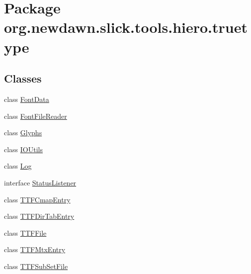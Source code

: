 \hypertarget{namespaceorg_1_1newdawn_1_1slick_1_1tools_1_1hiero_1_1truetype}{}\section{Package org.\+newdawn.\+slick.\+tools.\+hiero.\+truetype}
\label{namespaceorg_1_1newdawn_1_1slick_1_1tools_1_1hiero_1_1truetype}
\subsection*{Classes}
\begin{DoxyCompactItemize}
\item 
class \mbox{\hyperlink{classorg_1_1newdawn_1_1slick_1_1tools_1_1hiero_1_1truetype_1_1_font_data}{Font\+Data}}
\item 
class \mbox{\hyperlink{classorg_1_1newdawn_1_1slick_1_1tools_1_1hiero_1_1truetype_1_1_font_file_reader}{Font\+File\+Reader}}
\item 
class \mbox{\hyperlink{classorg_1_1newdawn_1_1slick_1_1tools_1_1hiero_1_1truetype_1_1_glyphs}{Glyphs}}
\item 
class \mbox{\hyperlink{classorg_1_1newdawn_1_1slick_1_1tools_1_1hiero_1_1truetype_1_1_i_o_utils}{I\+O\+Utils}}
\item 
class \mbox{\hyperlink{classorg_1_1newdawn_1_1slick_1_1tools_1_1hiero_1_1truetype_1_1_log}{Log}}
\item 
interface \mbox{\hyperlink{interfaceorg_1_1newdawn_1_1slick_1_1tools_1_1hiero_1_1truetype_1_1_status_listener}{Status\+Listener}}
\item 
class \mbox{\hyperlink{classorg_1_1newdawn_1_1slick_1_1tools_1_1hiero_1_1truetype_1_1_t_t_f_cmap_entry}{T\+T\+F\+Cmap\+Entry}}
\item 
class \mbox{\hyperlink{classorg_1_1newdawn_1_1slick_1_1tools_1_1hiero_1_1truetype_1_1_t_t_f_dir_tab_entry}{T\+T\+F\+Dir\+Tab\+Entry}}
\item 
class \mbox{\hyperlink{classorg_1_1newdawn_1_1slick_1_1tools_1_1hiero_1_1truetype_1_1_t_t_f_file}{T\+T\+F\+File}}
\item 
class \mbox{\hyperlink{classorg_1_1newdawn_1_1slick_1_1tools_1_1hiero_1_1truetype_1_1_t_t_f_mtx_entry}{T\+T\+F\+Mtx\+Entry}}
\item 
class \mbox{\hyperlink{classorg_1_1newdawn_1_1slick_1_1tools_1_1hiero_1_1truetype_1_1_t_t_f_sub_set_file}{T\+T\+F\+Sub\+Set\+File}}
\end{DoxyCompactItemize}

